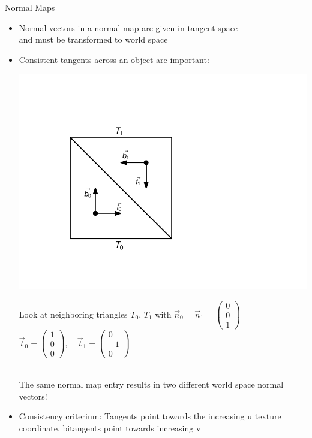 \documentclass[utf8,stillsansserifmath,fleqn,t]{beamer}
\begin{document}
\begin{frame}
\frametitle{\insertsection}
Normal Maps
\begin{itemize}
\item Normal vectors in a normal map are given in tangent space\\
and must be transformed to world space
\item Consistent tangents across an object are important:\\
\begin{minipage}{.27\textwidth}
\includegraphics[width=\textwidth]{./fig/tangentspace-consistency-example.pdf}
\end{minipage}\hfill
\begin{minipage}{.5\textwidth}
Look at neighboring triangles $T_0$, $T_1$ with $\vec{n}_0=\vec{n}_1=\begin{pmatrix}0\\ 0\\ 1\end{pmatrix}$\\
$\vec{t}_0 = \begin{pmatrix}1\\ 0\\ 0\end{pmatrix}, \quad
\vec{t}_1 = \begin{pmatrix}0\\ -1\\ 0\end{pmatrix}$
\end{minipage}\\
The same normal map entry results in two different world space normal vectors!
    \item Consistency criterium: Tangents point towards the increasing u texture coordinate,
    bitangents point towards increasing v
\end{itemize}
\end{frame}
\end{document}
